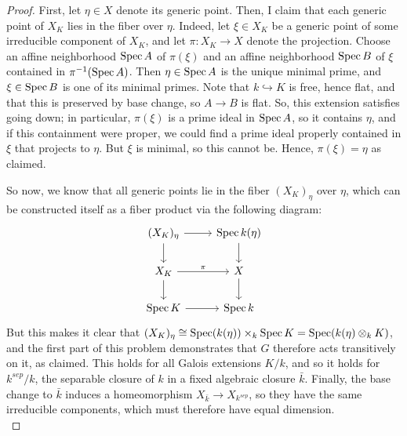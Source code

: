 \begin{proof}
	First, let $\eta \in X$ denote its generic point. Then, I claim that each generic point of $X_K$ lies in the fiber over $\eta$. Indeed, let $\xi \in X_K$ be a generic point of some irreducible component of $X_K$, and let $\pi : X_K \to X$ denote the projection. Choose an affine neighborhood $\operatorname{Spec} A$ of $\pi(\xi)$ and an affine neighborhood $\operatorname{Spec} B$ of $\xi$ contained in $\pi^{-1}(\operatorname{Spec} A)$. Then $\eta \in \operatorname{Spec} A$ is the unique minimal prime, and $\xi \in \operatorname{Spec} B$ is one of its minimal primes. Note that $k \hookrightarrow K$ is free, hence flat, and that this is preserved by base change, so $A \to B$ is flat. So, this extension satisfies going down; in particular, $\pi(\xi)$ is a prime ideal in $\operatorname{Spec} A$, so it contains $\eta$, and if this containment were proper, we could find a prime ideal properly contained in $\xi$ that projects to $\eta$. But $\xi$ is minimal, so this cannot be. Hence, $\pi(\xi) = \eta$ as claimed.
	
	So now, we know that all generic points lie in the fiber $(X_K)_\eta$ over $\eta$, which can be constructed itself as a fiber product via the following diagram:
	\[ \begin{tikzcd} (X_K)_\eta \arrow[r] \arrow[d] & \Spec k(\eta) \arrow[d] \\ X_K \arrow[r,"\pi"] \arrow[d] & X \arrow[d] \\ \Spec K \arrow[r] & \Spec k \end{tikzcd} \]
	But this makes it clear that $(X_K)_\eta \cong \operatorname{Spec}(k(\eta)) \times_k \operatorname{Spec} K = \operatorname{Spec}(k(\eta) \otimes_k K)$, and the first part of this problem demonstrates that $G$ therefore acts transitively on it, as claimed. This holds for all Galois extensions $K/k$, and so it holds for $k^{sep}/k$, the separable closure of $k$ in a fixed algebraic closure $\bar{k}$. Finally, the base change to $\bar{k}$ induces a homeomorphism $X_{\bar{k}} \to X_{k^{sep}}$, so they have the same irreducible components, which must therefore have equal dimension. \\
	

\end{proof}

